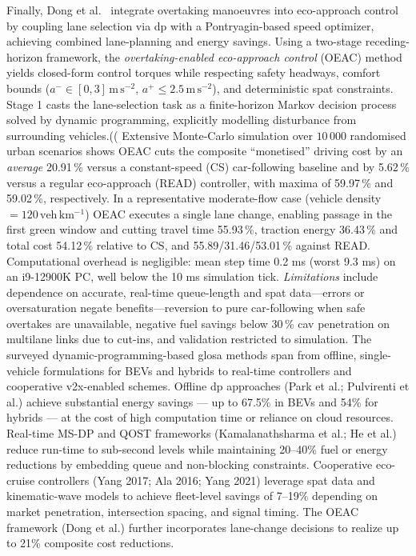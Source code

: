 \mynewline
Finally, Dong et al.\ \cite{Dong2024} integrate overtaking manoeuvres into eco-approach control by coupling lane selection via \ac{dp} with a Pontryagin-based speed optimizer, achieving combined lane-planning and energy savings. Using a two-stage receding-horizon framework, the \textit{overtaking-enabled eco-approach control} (OEAC) method yields closed-form control torques while respecting safety headways, comfort bounds ($a^{-}\!\in[0,3]\,\mathrm{m\,s^{-2}}$, $a^{+}\!\le2.5\,\mathrm{m\,s^{-2}}$), and deterministic \ac{spat} constraints. Stage 1 casts the lane-selection task as a finite-horizon Markov decision process solved by dynamic programming, explicitly modelling disturbance from surrounding vehicles.(( Extensive Monte-Carlo simulation over \(10\,000\) randomised urban scenarios shows OEAC cuts the composite “monetised” driving cost by an \emph{average} 20.91\,\% versus a constant-speed (CS) car-following baseline and by 5.62\,\% versus a regular eco-approach (READ) controller, with maxima of 59.97\,\% and 59.02\,\%, respectively. In a representative moderate-flow case (vehicle density \(=120\,\mathrm{veh\,km^{-1}}\)) OEAC executes a single lane change, enabling passage in the first green window and cutting travel time 55.93\,\%, traction energy 36.43\,\% and total cost 54.12\,\% relative to CS, and 55.89/31.46/53.01\,\% against READ. Computational overhead is negligible: mean step time 0.2 ms (worst 9.3 ms) on an i9-12900K PC, well below the 10 ms simulation tick. \emph{Limitations} include dependence on accurate, real-time queue-length and \ac{spat} data—errors or oversaturation negate benefits—reversion to pure car-following when safe overtakes are unavailable, negative fuel savings below 30\,\% \ac{cav} penetration on multilane links due to cut-ins, and validation restricted to simulation. 
\mynewline
The surveyed dynamic-programming-based \ac{glosa} methods span from offline, single-vehicle formulations for BEVs and hybrids to real-time controllers and cooperative \ac{v2x}-enabled schemes. Offline \ac{dp} approaches (Park et al.; Pulvirenti et al.) achieve substantial energy savings --- up to 67.5\% in BEVs and 54\% for hybrids --- at the cost of high computation time or reliance on cloud resources. Real-time MS-DP and QOST frameworks (Kamalanathsharma et al.; He et al.) reduce run-time to sub-second levels while maintaining 20–40\% fuel or energy reductions by embedding queue and non-blocking constraints. Cooperative eco-cruise controllers (Yang 2017; Ala 2016; Yang 2021) leverage \ac{spat} data and kinematic-wave models to achieve fleet-level savings of 7–19\% depending on market penetration, intersection spacing, and signal timing. The OEAC framework (Dong et al.) further incorporates lane-change decisions to realize up to 21\% composite cost reductions.
